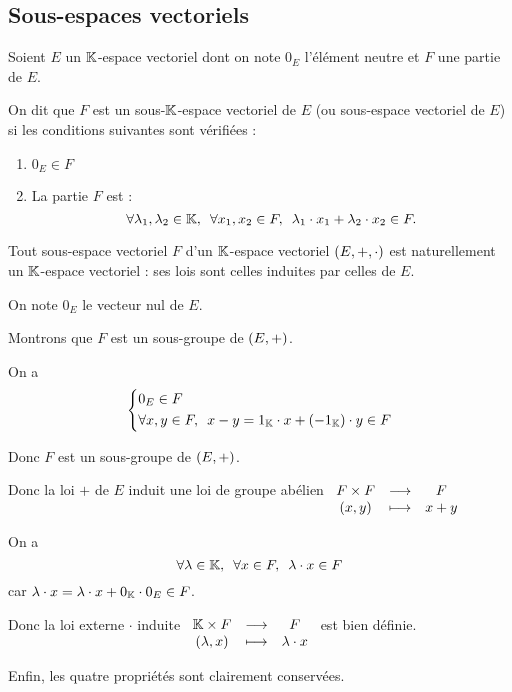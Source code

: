 \subsection{Sous-espaces vectoriels}

\begin{defi}
Soient \(E\) un \(\mathbb{K}\)-espace vectoriel dont on note \(0_E\) l'élément neutre et \(F\) une partie de \(E\).

On dit que \(F\) est un sous-\(\mathbb{K}\)-espace vectoriel de \(E\) (ou sous-espace vectoriel de \(E\)) si les conditions suivantes sont vérifiées :

\begin{enumerate}
\item \(0_E\in F\) \\

\item La partie \(F\) est  : \[\quantifs{\forall\lambda_1,\lambda_2\in\K;\forall x_1,x_2\in F}\lambda_1\cdot x_1+\lambda_2\cdot x_2\in F.\]
\end{enumerate}
\end{defi}

\begin{prop}
Tout sous-espace vectoriel \(F\) d'un \(\mathbb{K}\)-espace vectoriel \(\corps{E}[+][\cdot]\) est naturellement un \(\mathbb{K}\)-espace vectoriel : ses lois sont celles induites par celles de \(E\).
\end{prop}

\begin{dem}
On note \(0_E\) le vecteur nul de \(E\).

Montrons que \(F\) est un sous-groupe de \(\groupe{E}\).

On a \[\begin{dcases}0_E\in F \\ \quantifs{\forall x,y\in F}x-y=1_\K\cdot x+\paren{-1_\K}\cdot y\in F\end{dcases}\]

Donc \(F\) est un sous-groupe de \(\groupe{E}\).

Donc la loi \(+\) de \(E\) induit une loi de groupe abélien \(\begin{array}[t]{ccc}F\times F & \longrightarrow & F \\ \left(x,y\right) & \longmapsto & x+y\end{array}\)

On a \[\quantifs{\forall\lambda\in\K;\forall x\in F}\lambda\cdot x\in F\] car \(\lambda\cdot x=\lambda\cdot x+0_{\mathbb{K}}\cdot0_E\in F\).

Donc la loi externe \(\cdot\) induite \(\begin{array}[t]{ccc}\mathbb{K}\times F & \longrightarrow & F \\ \left(\lambda,x\right) & \longmapsto & \lambda\cdot x\end{array}\) est bien définie.

Enfin, les quatre propriétés sont clairement conservées.
\end{dem}

